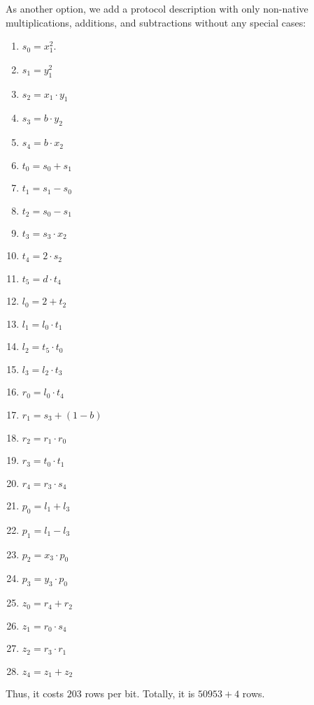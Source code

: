 As another option, we add a protocol description with only non-native multiplications, additions, and subtractions without any special cases:
\begin{enumerate}

\item $s_0 = x_1^2$.
\item $s_1 = y_1^2$
\item $s_2 = x_1 \cdot y_1$
\item $s_3 = b \cdot y_2$
\item $s_4 = b \cdot x_2$

\item $t_0 = s_0 + s_1$
\item $t_1 = s_1 - s_0$
\item $t_2 = s_0 - s_1$
\item $t_3 = s_3 \cdot x_2$
\item $t_4 = 2 \cdot s_2$
\item $t_5 = d \cdot t_4$

\item $l_0 = 2 + t_2$
\item $l_1 = l_0 \cdot t_1$
\item $l_2 = t_5 \cdot t_0$
\item $l_3 = l_2 \cdot t_3$

\item $r_0 = l_0 \cdot t_4$
\item $r_1 = s_3 + (1 - b)$
\item $r_2 = r_1 \cdot r_0$
\item $r_3 = t_0 \cdot t_1$
\item $r_4 = r_3 \cdot s_4$

\item $p_0 = l_1 + l_3$
\item $p_1 = l_1 - l_3$
\item $p_2 = x_3 \cdot p_0$
\item $p_3 = y_3 \cdot p_0$

\item $z_0 = r_4 + r_2$
\item $z_1 = r_0 \cdot s_4$
\item $z_2 = r_3 \cdot r_1$
\item $z_4 = z_1 + z_2$
\end{enumerate}


Thus, it costs $203$ rows per bit. 
Totally, it is $50 953 + 4 $ rows.